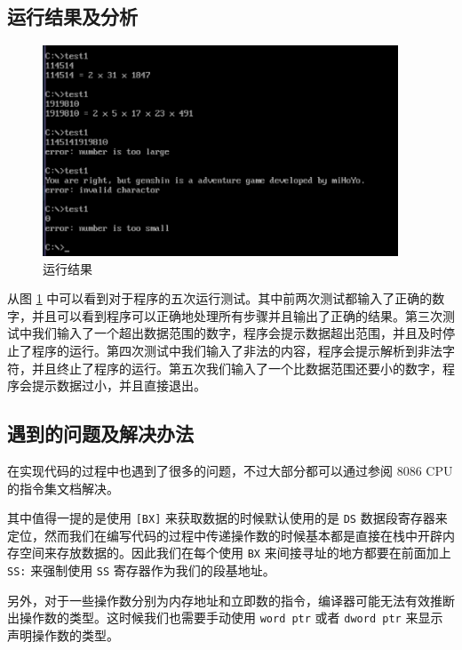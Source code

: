 \subsection{运行结果及分析}

\begin{figure}[h]
  \centering
  \includegraphics[width=300pt]{figure/test1res.png}
  \caption{运行结果}
  \label{fig:result1}
\end{figure}

从图 \ref{fig:result1} 中可以看到对于程序的五次运行测试。其中前两次测试都输入了正确的数字，并且可以看到程序可以正确地处理所有步骤并且输出了正确的结果。第三次测试中我们输入了一个超出数据范围的数字，程序会提示数据超出范围，并且及时停止了程序的运行。第四次测试中我们输入了非法的内容，程序会提示解析到非法字符，并且终止了程序的运行。第五次我们输入了一个比数据范围还要小的数字，程序会提示数据过小，并且直接退出。

\subsection{遇到的问题及解决办法}

在实现代码的过程中也遇到了很多的问题，不过大部分都可以通过参阅 8086 CPU 的指令集文档解决。

其中值得一提的是使用 \verb|[BX]| 来获取数据的时候默认使用的是 \verb|DS| 数据段寄存器来定位，然而我们在编写代码的过程中传递操作数的时候基本都是直接在栈中开辟内存空间来存放数据的。因此我们在每个使用 \verb|BX| 来间接寻址的地方都要在前面加上 \verb|SS:| 来强制使用 \verb|SS| 寄存器作为我们的段基地址。

另外，对于一些操作数分别为内存地址和立即数的指令，编译器可能无法有效推断出操作数的类型。这时候我们也需要手动使用 \verb|word ptr| 或者 \verb|dword ptr| 来显示声明操作数的类型。
